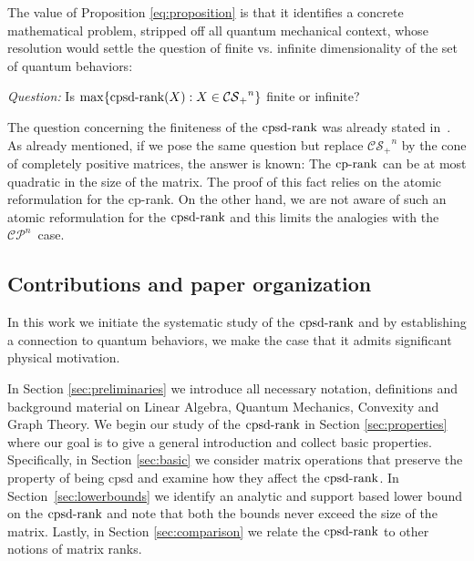 \documentclass{siamart}
\begin{document}
{{{The value of   Proposition \ref{eq:proposition} is that {it}
identifies a concrete   mathematical problem, stripped {off} all
quantum mechanical context,  whose resolution would  settle  the
question of finite vs. infinite  dimensionality of the set of
quantum behaviors:

\medskip

\begin{center}{\em Question:} Is $ \max\{ {\mathrm{cpsd}\textnormal{-rank}}(X): X\in {\mathcal{CS}_+}^n \}$ finite or infinite?
\end{center}

\medskip

The question concerning  the finiteness of the ${\mathrm{cpsd}\textnormal{-rank}}$ was already stated in~\cite{FGPRT}.
As already mentioned,  if we pose  the same question but  replace  {${\mathcal{CS}_+}^n$}  by the cone of  completely positive matrices, the answer is {known}: The  ${\mathrm{cp}\textnormal{-rank}}$  can be at most  quadratic in the size of the matrix. The proof of this fact relies  on  the atomic reformulation for the cp-rank. On the other hand,  we are not aware of such an atomic  {reformulation} for the ${\mathrm{cpsd}\textnormal{-rank}}$ and this limits the analogies with the {${\mathcal{CP}}^n$}~case.

\subsection{Contributions and paper organization}\label{sec:contributions}

In this work we initiate the systematic study of the  ${\mathrm{cpsd}\textnormal{-rank}}$ and by establishing a connection to quantum behaviors, we make  the case  that it admits   significant physical motivation.

In Section \ref{sec:preliminaries} we introduce all necessary notation, definitions and background  material on Linear Algebra, Quantum Mechanics, Convexity and Graph Theory.
  We begin our study of the ${\mathrm{cpsd}\textnormal{-rank}}$ in  Section \ref{sec:properties}  where our goal is to give a general introduction and   collect  basic properties.
Specifically, in Section \ref{sec:basic} we consider matrix operations that preserve  the property of being cpsd and examine how they affect the ${\mathrm{cpsd}\textnormal{-rank}}$.  In Section~\ref{sec:lowerbounds}  we identify an analytic and support based lower bound  on the ${\mathrm{cpsd}\textnormal{-rank}}$ and note that both the bounds
never exceed the size of the matrix. Lastly, in Section \ref{sec:comparison} we relate the ${\mathrm{cpsd}\textnormal{-rank}}$ to other notions of matrix
ranks.

}}}
\end{document}
